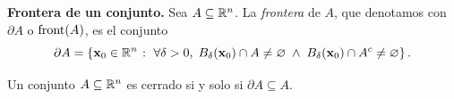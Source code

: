  \begin{definition} \textbf{Frontera de un conjunto.} \label{def:frontera}
    Sea $A  \subseteq  \mathbb{R}^n$. La \emph{frontera} de $A$, que denotamos con $\partial A$ o $\operatorname{front}(A)$, es el conjunto
    \[
     \partial A = \left\lbrace \vect{x}_0 \in \Rn{n} \;\colon \; \forall \delta > 0, \;
     B_{\delta}(\vect{x}_0) \cap A \ne \varnothing\;\land\;
     B_{\delta}(\vect{x}_0) \cap A^c \ne \varnothing \right\rbrace.
    \]
   \end{definition}
   
   \begin{propertie} \label{prop:cerrado_front}
    Un conjunto $A  \subseteq  \mathbb{R}^n$ es cerrado si y solo si $\partial A  \subseteq  A$.
   \end{propertie}
   